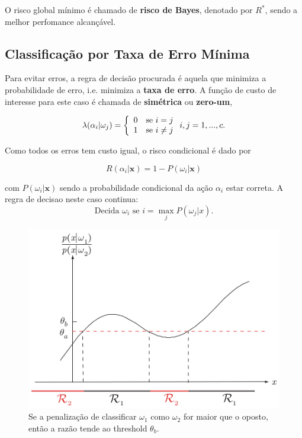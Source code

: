 \documentclass[a4paper,12pt,twocolumn]{article}
\newcommand{\twopartdef}[4]
{
    \left\{
        \begin{array}{ll}
            #1 & \mbox{se } #2 \\
            #3 & \mbox{se } #4
        \end{array}
    \right.
}
\begin{document}
O risco global mínimo é chamado de \textbf{risco de Bayes}, denotado por $R^*$, sendo a melhor perfomance alcançável.

\subsection{Classificação por Taxa de Erro Mínima}

Para evitar erros, a regra de decisão procurada é aquela que minimiza a probabilidade de erro, i.e. minimiza a \textbf{taxa de erro}. A função de custo de interesse para este caso é chamada de \textbf{simétrica} ou \textbf{zero-um},

\begin{equation}
    \lambda(\alpha_i|\omega_j) = \twopartdef{0}{i=j}{1}{i \neq j} \hfill i, j = 1, ..., c.
    \label{eq:loss_zero_one}
\end{equation}

Como todos os erros tem custo igual, o risco condicional é dado por

\begin{equation}
    R(\alpha_i|\mathbf{x}) = 1 - P(\omega_i|\mathbf{x})
    \label{eq:conditional_risk_zero_one}
\end{equation}

\noindent com $P(\omega_i|\mathbf{x})$ sendo a probabilidade condicional da ação $\alpha_i$ estar correta. A regra de decisao neste caso continua:
\begin{equation}
    \text{Decida } \omega_i \text{ se } i = \max_j P(\omega_j|x).
    \label{eq:decision_4}
\end{equation}

\begin{figure}[ht]
    \centering
    \includegraphics[scale=0.5]{decision_region}
    \caption{Se a penalização de classificar $\omega_1$ como $\omega_2$ for maior que o oposto, então a razão tende ao threshold $\theta_b$.}
    \label{fig:decision_region}
\end{figure}
\end{document}
